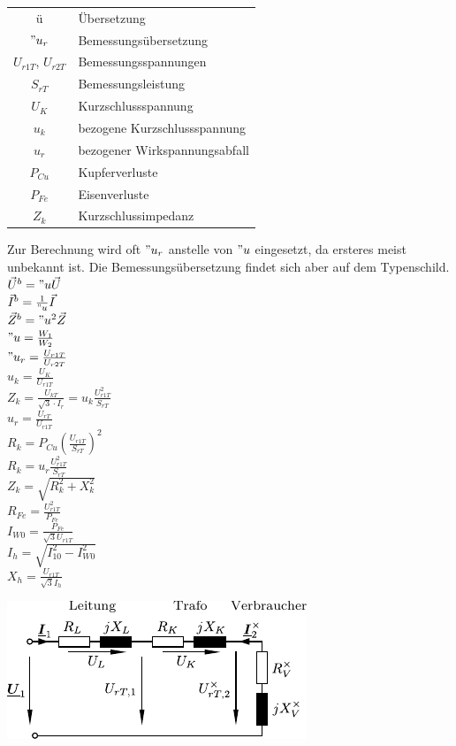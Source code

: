 \documentclass[european]{latex4ei_sheet}
\begin{document}
		\begin{tabular}{cl}
		ü & Übersetzung \\
		$"u_r$ & Bemessungsübersetzung \\
		$U_{r1T}$, $U_{r2T}$ & Bemessungsspannungen \\
		$S_{rT}$ & Bemessungsleistung \\
		$U_{K}$ & Kurzschlussspannung \\
		$u_k$ & bezogene Kurzschlussspannung \\
		$u_r$ & bezogener Wirkspannungsabfall \\
		$P_{Cu}$ & Kupferverluste \\
		$P_{Fe}$ & Eisenverluste \\
		$Z_k$ & Kurzschlussimpedanz
		\end{tabular}

		Zur Berechnung wird oft $"u_r$ anstelle von $"u$ eingesetzt, da ersteres meist unbekannt ist. Die Bemessungsübersetzung findet sich aber auf dem Typenschild. \\
		$\vec U^b = "u \vec U$ \\
		$\vec I^b = \frac{1}{"u} \vec I$ \\
		$\vec Z^b = "u^2 \vec Z$ \\
		$"u = \frac{W_1}{W_2}$ \\
		$"u_r = \frac{U_{r1T}}{U_{r2T}}$ \\
		$u_k = \frac{U_{K}}{U_{r1T}}$ \\
		$Z_k = \frac{U_{kT}}{\sqrt{3}\cdot I_r} = u_k \frac{U_{r1T}^2}{S_{rT}}$ \\
		$u_r = \frac{U_{rT}}{U_{r1T}}$ \\
		$R_k = P_{Cu} \left( \frac{U_{r1T}}{S_{rT}} \right)^2$ \\
		$R_k = u_r \frac{U_{r1T}^2}{S_{rT}}$ \\
		$Z_k = \sqrt{R_k^2 + X_k^2}$ \\
		$R_{Fe} = \frac{U_{r1T}^2}{P_{Fe}}$ \\
		$I_{W0} = \frac{P_{Fe}}{\sqrt{3} U_{r1T}}$ \\
		$I_h = \sqrt{I_{10}^2 - I_{W0}^2}$ \\
		$X_h = \frac{U_{r1T}}{\sqrt{3} I_h}$
	
	
		\includegraphics{./img/LeitungTrafo.pdf}
	
\end{document}
